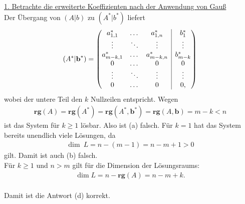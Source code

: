 \underline{1. Betrachte die erweiterte Koeffizienten nach der Anwendung von Gauß}\\
Der Übergang von $ (A | b) $ zu $ (A^\ast|b^\ast ) $ liefert
\begin{align*}
(A^\ast|\textbf{b}^\ast )=
\begin{pmatrix}
a_{1,1}^\ast & \dots & a_{1,n}^\ast & \BAR& b_1^\ast\\
\vdots & \ddots & \vdots  & \BAR& \vdots\\
a_{m -k,1}^\ast & \dots & a_{m-k,n}^\ast & \BAR& b_{m-k}^\ast\\
0 & \dots & 0 & \BAR& 0\\
\vdots & \ddots & \vdots  & \BAR& \vdots\\
0 & \dots & 0 & \BAR& 0,
\end{pmatrix}
\end{align*}
wobei der untere Teil den $ k $ Nullzeilen entspricht.
Wegen 
\begin{align*}
\textbf{rg}(A) = \textbf{rg}(A^\ast) = \textbf{rg}(A^\ast , \textbf{b}^\ast) = \textbf{rg}(A , \textbf{b}) =  m-k < n
\end{align*}
ist das System für $ k \geq 1 $ lösbar. Also ist (a) falsch.
Für $ k = 1 $ hat das System bereits unendlich viele Lösungen, da
\begin{align*}
\dim \ L = n-(m-1) = n -m +1 > 0
\end{align*}
gilt. Damit ist auch (b) falsch.\\
Für $ k \geq 1  $ und $ n > m  $ gilt für die Dimension der Lösungsraums:
\begin{align*}
\dim L = n - \textbf{rg}(A) = n -m + k.
\end{align*}
\ \\
Damit ist die Antwort (d) korrekt.